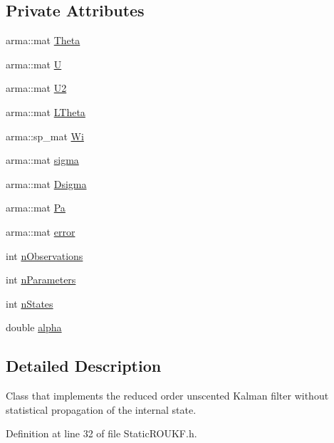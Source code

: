 \subsection*{Private Attributes}
\begin{DoxyCompactItemize}
\item 
arma\+::mat \mbox{\hyperlink{classStaticROUKF_a8c15ae84fa30d7663ba976f8996dd81f}{Theta}}
\item 
arma\+::mat \mbox{\hyperlink{classStaticROUKF_a58ed92ebb17443f82e2c7124287c8173}{U}}
\item 
arma\+::mat \mbox{\hyperlink{classStaticROUKF_a7d4e7278e9aed5a551905ce4109da072}{U2}}
\item 
arma\+::mat \mbox{\hyperlink{classStaticROUKF_abbdca814d9577bf7b9f34264cb1f6836}{L\+Theta}}
\item 
arma\+::sp\+\_\+mat \mbox{\hyperlink{classStaticROUKF_a612d1fae1853a0dba561a2557bb6d844}{Wi}}
\item 
arma\+::mat \mbox{\hyperlink{classStaticROUKF_a135dff2733c7d15f6a481a8b09d82dce}{sigma}}
\item 
arma\+::mat \mbox{\hyperlink{classStaticROUKF_a23471ddebcf45d3d2c6a0867ac47bde3}{Dsigma}}
\item 
arma\+::mat \mbox{\hyperlink{classStaticROUKF_a0d0d000c613a6f83224f1e2af9c90c26}{Pa}}
\item 
arma\+::mat \mbox{\hyperlink{classStaticROUKF_ab4f563a81a206f47c1b60e3b0e80f356}{error}}
\item 
int \mbox{\hyperlink{classStaticROUKF_a3b30dbaa7706106840323888eff5f7b5}{n\+Observations}}
\item 
int \mbox{\hyperlink{classStaticROUKF_a2b03763759259e2742eef0221a4218f7}{n\+Parameters}}
\item 
int \mbox{\hyperlink{classStaticROUKF_ad512fa829a858c957c9fa38f45e6b1e0}{n\+States}}
\item 
double \mbox{\hyperlink{classStaticROUKF_a8b9ab6dd1eb28ac72f1d7f0d1f7f7685}{alpha}}
\end{DoxyCompactItemize}


\subsection{Detailed Description}
Class that implements the reduced order unscented Kalman filter without statistical propagation of the internal state. 

Definition at line 32 of file Static\+R\+O\+U\+K\+F.\+h.




